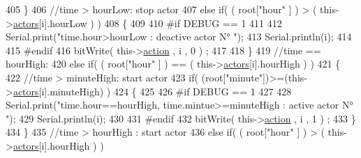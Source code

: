 \begin{DoxyCode}
405                             \}
406                             \textcolor{comment}{//time > hourLow: stop actor}
407                             \textcolor{keywordflow}{else} \textcolor{keywordflow}{if}( ( root[\textcolor{stringliteral}{"hour"} ] ) > ( this->\hyperlink{class_jetpack_a7e16d2f97837f9712a2e6de1c50d99db}{actors}[i].hourLow ) )
408                             \{
409     
410 \textcolor{preprocessor}{                            #if DEBUG == 1 }
411                         
412                                 Serial.print(\textcolor{stringliteral}{"time.hour>hourLow : deactive actor N° "});
413                                 Serial.println(i);
414                 
415 \textcolor{preprocessor}{                            #endif      }
416                                 bitWrite( this->\hyperlink{class_jetpack_aca3142925a7b0834b34ae91d26af7765}{action} , i , 0 ) ;
417                                                     
418                             \}
419                             \textcolor{comment}{//time == hourHigh:}
420                             \textcolor{keywordflow}{else} \textcolor{keywordflow}{if}( ( root[\textcolor{stringliteral}{"hour"} ] ) == ( this->\hyperlink{class_jetpack_a7e16d2f97837f9712a2e6de1c50d99db}{actors}[i].hourHigh ) )
421                             \{
422                                 \textcolor{comment}{//time > minuteHigh: start actor}
423                                 \textcolor{keywordflow}{if}( (root[\textcolor{stringliteral}{"minute"}])>=(this->\hyperlink{class_jetpack_a7e16d2f97837f9712a2e6de1c50d99db}{actors}[i].minuteHigh) )
424                                 \{
425                         
426 \textcolor{preprocessor}{                                #if DEBUG == 1 }
427                         
428                                     Serial.print(\textcolor{stringliteral}{"time.hour==hourHigh, time.mintue>=minuteHigh : active
       actor N° "});
429                                     Serial.println(i);
430                         
431 \textcolor{preprocessor}{                                #endif}
432                                     bitWrite( this->\hyperlink{class_jetpack_aca3142925a7b0834b34ae91d26af7765}{action} , i , 1 ) ;
433                                 \}                   
434                             \}
435                             \textcolor{comment}{//time > hourHigh : start actor}
436                             \textcolor{keywordflow}{else} \textcolor{keywordflow}{if}( ( root[\textcolor{stringliteral}{"hour"} ] ) > ( this->\hyperlink{class_jetpack_a7e16d2f97837f9712a2e6de1c50d99db}{actors}[i].hourHigh ) )

\end{DoxyCode}

